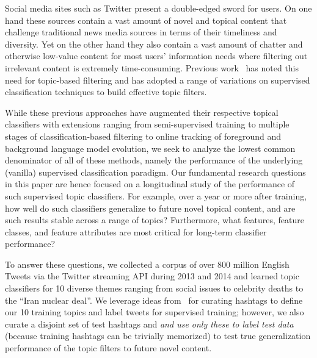 
\label{sec:introduction}

Social media sites such as Twitter present a double-edged sword for
users.  On one hand these sources contain a vast amount of novel and
topical content that challenge traditional news media sources in terms
of their timeliness and diversity.  Yet on the other hand they also
contain a vast amount of chatter and otherwise low-value content for most
users' information needs where filtering out irrelevant content is
extremely time-consuming.  Previous work~\cite{lin2011smoothing,yang2014large,magdy} 
has noted this need for topic-based filtering and has adopted a range
of variations on supervised classification techniques to build effective
topic filters.

While these previous approaches have augmented their respective topical classifiers with extensions
ranging from semi-supervised training to multiple stages of classification-based filtering to online tracking of foreground and background language model evolution, 
we seek to analyze the lowest common denominator
of all of these methods, namely the performance of the underlying (vanilla) supervised 
classification paradigm.
Our fundamental research questions in this paper are hence focused on a longitudinal study
of the performance of such supervised topic classifiers.  
For example, over a year or more after training, how well do such classifiers generalize to future novel topical content, and are such results stable across a range of topics?  Furthermore, what features, feature classes, and feature attributes are most critical for long-term classifier performance?  

To answer these questions, we collected a corpus of over 800 million English Tweets via the Twitter streaming API during 2013 and 2014 and learned topic classifiers for 10 diverse themes ranging from social issues to celebrity deaths to the ``Iran nuclear deal''.  We leverage ideas from~\cite{lin2011smoothing} for curating hashtags to define our 10 training topics and label
tweets for supervised training; however, we also curate a disjoint set of test hashtags and 
\emph{and use only these to label test data} (because training hashtags can be trivially memorized) to test true generalization performance of the topic filters to future novel content. 

